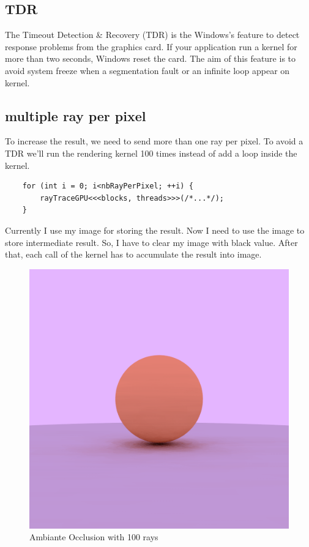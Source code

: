 \documentclass{article}
\begin{document}
\subsection{TDR}
The Timeout Detection \& Recovery (TDR) is the Windows's feature to detect response problems from the graphics card. If your application run a kernel for more than two seconds, Windows reset the card. The aim of this feature is to avoid system freeze when a segmentation fault or an infinite loop appear on kernel.\\

\subsection{multiple ray per pixel}
To increase the result, we need to send more than one ray per pixel. To avoid a TDR we'll run the rendering kernel 100 times instead of add a loop inside the kernel.
\begin{lstlisting}
	for (int i = 0; i<nbRayPerPixel; ++i) {
		rayTraceGPU<<<blocks, threads>>>(/*...*/);
	}
\end{lstlisting}

Currently I use my image for storing the result. Now I need to use the image to store intermediate result. So, I have to clear my image with black value. After that, each call of the kernel has to accumulate the result into image.

\begin{figure}[h]
	\centering
	\includegraphics[scale=0.47]{figures/result.png}
	\caption{Ambiante Occlusion with 100 rays}
\end{figure}
\end{document}
